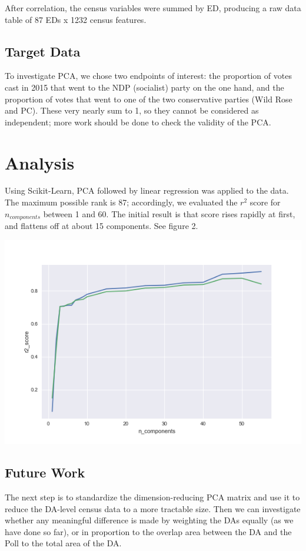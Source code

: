 \documentclass{article}
\begin{document}
After correlation, the census variables were summed by ED, producing a raw data table of 87 EDs x 1232 census features.

\subsection{Target Data}

To investigate PCA, we chose two endpoints of interest: the proportion of votes cast in 2015 that went to the NDP (socialist) party on the one hand, and the proportion of votes that went to one of the two conservative parties (Wild Rose and PC).  These very nearly sum to 1, so they cannot be considered as independent; more work should be done to check the validity of the PCA.

\section{Analysis}

Using Scikit-Learn, PCA followed by linear regression was applied to the data. The maximum possible rank is 87; accordingly, we evaluated the $r^2$ score for $n_{components}$ between 1 and 60.  The initial result is that score rises rapidly at first, and flattens off at about 15 components.  See figure 2.

\includegraphics[scale=0.4]{figure2-pca.png}

\subsection{Future Work}

The next step is to standardize the dimension-reducing PCA matrix and use it to reduce the DA-level census data to a more tractable size.  Then we can investigate whether any meaningful difference is made by weighting the DAs equally (as we have done so far), or in proportion to the overlap area between the DA and the Poll to the total area of the DA.
\end{document}
